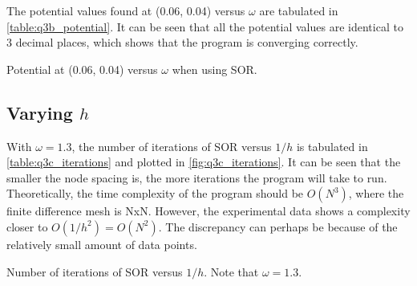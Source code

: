 \documentclass[a4paper,titlepage]{article}
\begin{document}
	The potential values found at (0.06, 0.04) versus $\omega$ are tabulated in \autoref{table:q3b_potential}. It can be seen that all the potential values are identical to 3 decimal places, which shows that the program is converging correctly.

	\begin{table}[!htb]
		\centering
		\caption{Potential at (0.06, 0.04) versus $\omega$ when using SOR.}
		\label{table:q3b_potential}
	\end{table}
	
	\subsection{Varying $h$}
	
	With $\omega = 1.3$, the number of iterations of SOR versus $1/h$ is tabulated in \autoref{table:q3c_iterations} and plotted in \autoref{fig:q3c_iterations}. It can be seen that the smaller the node spacing is, the more iterations the program will take to run. Theoretically, the time complexity of the program should be $O(N^3)$, where the finite difference mesh is NxN. However, the experimental data shows a complexity closer to $O(1/h^2) = O(N^2)$. The discrepancy can perhaps be because of the relatively small amount of data points.
	
	\begin{table}[!htb]
		\centering
		\caption{Number of iterations of SOR versus $1/h$. Note that $\omega=1.3$.}
		\label{table:q3c_iterations}
	\end{table}
	
\end{document}

